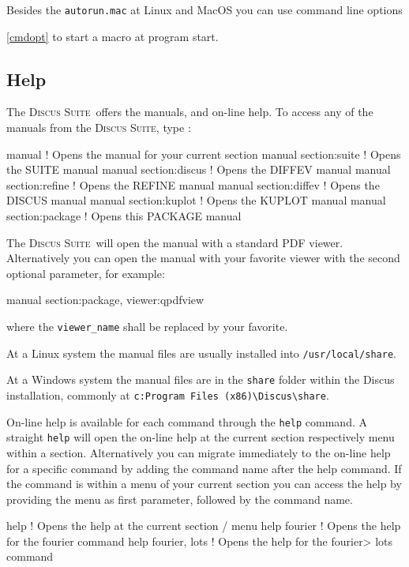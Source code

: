\documentclass[11pt]{report}
\newcommand{\Suite}{\textsc{Discus Suite\ }}
\newcommand{\suite}{\textsc{Discus Suite}}
\begin{document}
Besides the {\tt autorun.mac} at Linux and MacOS you can use command
line options {\ref {cmdopt} to start a macro at program start. 

\subsection{Help} \label{over-help}

The \Suite offers the manuals, and on-line help. To access any of the 
manuals from the \suite, type :
\begin{MacVerbatim}
  manual                 ! Opens the manual for your current section
  manual section:suite   ! Opens the SUITE manual
  manual section:discus  ! Opens the DIFFEV manual
  manual section:refine  ! Opens the REFINE manual
  manual section:diffev  ! Opens the DISCUS manual
  manual section:kuplot  ! Opens the KUPLOT manual
  manual section:package ! Opens this PACKAGE manual
\end{MacVerbatim}

The \Suite will open the manual with a standard PDF viewer. Alternatively
you can open the manual with your favorite viewer with the second 
optional parameter, for example:
\begin{MacVerbatim}
 manual section:package, viewer:qpdfview
\end{MacVerbatim}
where the {\tt viewer\_name} shall be replaced by your favorite.

At a Linux system the manual files are usually installed into 
{\tt /usr/local/share}.

At a Windows system the manual files are in the {\tt share} folder 
within the Discus installation, commonly at
{\tt c:Program Files (x86)\textbackslash Discus\textbackslash share}.  

On-line help is available for each command through the {\tt help}
command. A straight {\tt help} will open the on-line help at the
current section respectively menu within a section. Alternatively
you can migrate immediately to the on-line help for a specific 
command by adding the command name after the help command. If 
the command is within a menu of your current section you can 
access the help by providing the menu as first parameter, followed
by the command name.

\begin{MacVerbatim}
help               ! Opens the help at the current section / menu
help fourier       ! Opens the help for the fourier command
help fourier, lots ! Opens the help for the fourier> lots command
\end{MacVerbatim}

}
\end{document}
